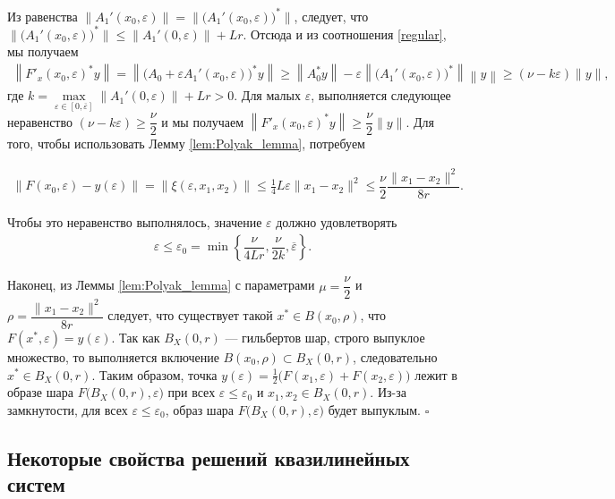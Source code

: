 \documentclass[../main.tex]{subfiles}
\begin{document}
Из равенства $\|A_1'(x_0,\varepsilon)\| = \|\big(A_1'(x_0,\varepsilon)\big)^*\| $, следует, что  $\|\big(A_1'(x_0,\varepsilon)\big)^*\| \leqslant \| A_1'(0,\varepsilon)\| + Lr$.
Отсюда и из соотношения \eqref{regular}, мы получаем 
\begin{gather*}
    \left\|F'_x(x_0, \varepsilon)^* y\right\| = \left\|\big(A_0 + \varepsilon A_1'(x_0, \varepsilon)\big)^* y\right\| \geqslant \left\|A_0^*y \right\| - \varepsilon \left\|\big(A_1'(x_0,\varepsilon)\big)^*\right\| \left\|y\right\| \geqslant (\nu - k\varepsilon)\|y\|,
\end{gather*} где $k = \max\limits_{\varepsilon \in [0,\overline{\varepsilon}]}\| A_1'(0,\varepsilon)\| + Lr > 0$.
Для малых $\varepsilon$, выполняется следующее неравенство $(\nu - k\varepsilon) \geqslant \dfrac{\nu}{2}$ и мы получаем $\left\|F'_x(x_0, \varepsilon)^* y\right\| \geqslant \dfrac{\nu}{2} \|y\|$. 
Для того, чтобы использовать Лемму  \ref{lem:Polyak_lemma}, потребуем

\begin{gather*}
    \| F(x_0,\varepsilon) - y(\varepsilon) \| = \|\xi(\varepsilon,x_1,x_2)\| \leqslant \frac{1}{4}L\varepsilon\|x_1-x_2\|^2 \leqslant \dfrac{\nu}{2} \dfrac{\|x_1-x_2\|^2}{8r}.
\end{gather*}

Чтобы это неравенство выполнялось, значение  $\varepsilon$ должно удовлетворять 
\begin{gather}
    \varepsilon \leqslant \varepsilon_0 = \min\left\{\dfrac{\nu}{4Lr}, \dfrac{\nu}{2k}, \overline{\varepsilon}\right\}.
\end{gather} 

Наконец, из Леммы \ref{lem:Polyak_lemma} с параметрами $\mu=\dfrac{\nu}{2}$ и $\rho=\dfrac{\|x_1-x_2\|^2}{8r}$ следует, что существует такой $x^*\in B(x_0, \rho)$, что $F(x^*,\varepsilon) = y(\varepsilon)$.
Так как $B_X(0, r)$ --- гильбертов шар, строго выпуклое множество, то выполняется включение $B(x_0, \rho) \subset B_X(0, r)$, следовательно $x^* \in B_X(0, r)$. 
Таким образом, точка $y(\varepsilon) = \frac{1}{2} \big( F(x_1,\varepsilon) + F(x_2,\varepsilon)\big)$ лежит в образе шара $F\big(B_X(0,r),\varepsilon\big) $  при  всех  $\varepsilon \leqslant \varepsilon_0$ и $x_1, x_2 \in B_X(0,r)$. 
Из-за замкнутости, для всех $\varepsilon \leqslant \varepsilon_0$, образ шара $F\big(B_X(0,r),\varepsilon\big) $ будет выпуклым.
\hfill$\square$\\[1ex]%

\subsection{Некоторые свойства решений квазилинейных систем}
\end{document}
